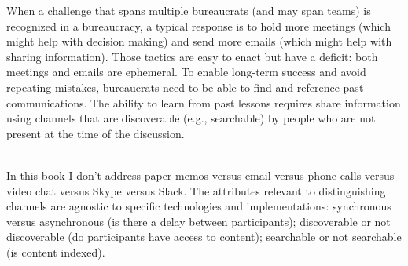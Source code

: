 When a challenge that spans multiple bureaucrats (and may span teams) is recognized in a bureaucracy, a typical response is to hold more meetings (which might help with decision making) and send more emails (which might help with sharing information). Those tactics are easy to enact but have a deficit: both meetings and emails are ephemeral. To enable long-term success and avoid repeating mistakes, bureaucrats need to be able to find and reference past communications. The ability to learn from past lessons requires share information using channels that are discoverable (e.g., searchable) by people who are not present at the time of the discussion. 

\ \\

In this book I don't address paper memos versus email versus phone calls versus video chat versus Skype versus Slack. 
The attributes relevant to distinguishing channels are agnostic to specific technologies and implementations: synchronous versus asynchronous (is there a delay between participants); discoverable or not discoverable (do participants have access to content); searchable or not searchable (is content indexed). 
